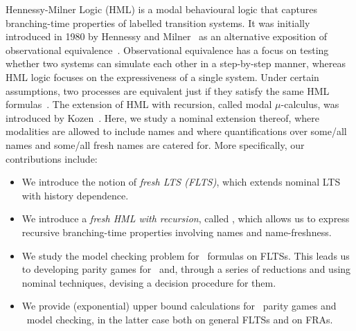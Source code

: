 
Hennessy-Milner Logic (HML) is a modal behavioural logic that captures branching-time properties of labelled transition systems. It was initially introduced in 1980 by Hennessy and Milner~\cite{DBLP:conf/icalp/HennessyM80} as an alternative exposition of observational equivalence~\cite{BradfieldS07}. Observational equivalence has a focus on testing whether two systems can simulate each other in a step-by-step manner,
whereas HML logic focuses on the expressiveness of a single system. Under certain assumptions, two
processes are equivalent just if they satisfy the same HML formulas~\cite{JOB}. The extension of HML with
recursion, called modal $\mu$-calculus, was introduced by Kozen~\cite{Kozen83}.
Here, we study a nominal extension thereof, where modalities
are allowed to include names and where quantifications over some/all names and some/all fresh names are catered for.
More specifically, our contributions include:
\begin{itemize}
\item We introduce the notion of \emph{fresh LTS (FLTS)}, which extends nominal LTS with history dependence.
\item We introduce a \emph{fresh HML with recursion}, called \fhml, which allows us to express recursive branching-time properties involving names and name-freshness.
\item We study the model checking problem for \fhml\ formulas on FLTSs. This leads us to developing parity games for \fhml\ and, through a series of reductions and using nominal techniques, devising a decision procedure for them.
\item We provide (exponential) upper bound calculations for \fhml\ parity games and \fhml\ model checking, in the latter case both on  general FLTSs and on FRAs.
\end{itemize}

